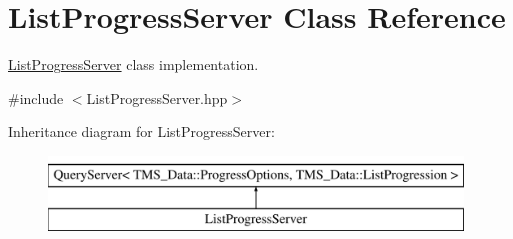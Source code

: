 \hypertarget{classListProgressServer}{
\section{ListProgressServer Class Reference}
\label{classListProgressServer}
}


\hyperlink{classListProgressServer}{ListProgressServer} class implementation.  




{\ttfamily \#include $<$ListProgressServer.hpp$>$}

Inheritance diagram for ListProgressServer:\begin{figure}[H]
\begin{center}
\leavevmode
\includegraphics[height=2.000000cm]{classListProgressServer}
\end{center}
\end{figure}
